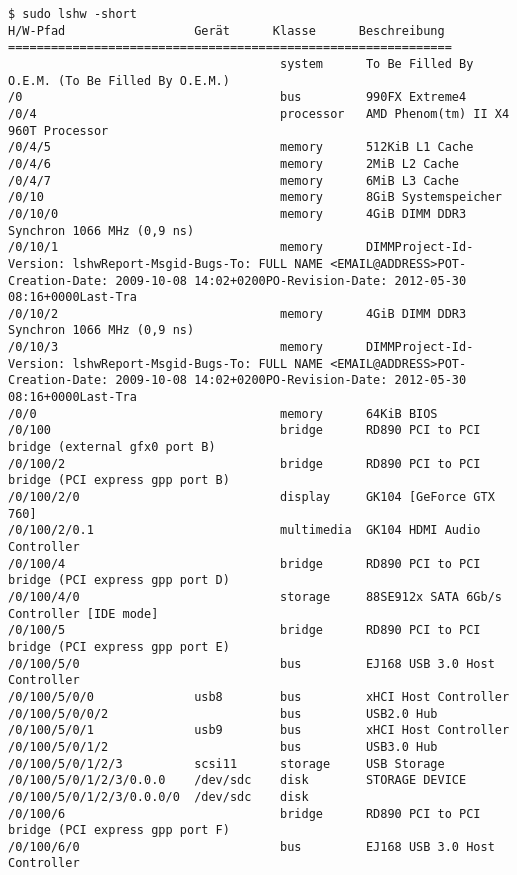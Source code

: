 \begin{small}
\begin{verbatim}
$ sudo lshw -short
H/W-Pfad                  Gerät      Klasse      Beschreibung
==============================================================
                                      system      To Be Filled By O.E.M. (To Be Filled By O.E.M.)
/0                                    bus         990FX Extreme4
/0/4                                  processor   AMD Phenom(tm) II X4 960T Processor
/0/4/5                                memory      512KiB L1 Cache
/0/4/6                                memory      2MiB L2 Cache
/0/4/7                                memory      6MiB L3 Cache
/0/10                                 memory      8GiB Systemspeicher
/0/10/0                               memory      4GiB DIMM DDR3 Synchron 1066 MHz (0,9 ns)
/0/10/1                               memory      DIMMProject-Id-Version: lshwReport-Msgid-Bugs-To: FULL NAME <EMAIL@ADDRESS>POT-Creation-Date: 2009-10-08 14:02+0200PO-Revision-Date: 2012-05-30 08:16+0000Last-Tra
/0/10/2                               memory      4GiB DIMM DDR3 Synchron 1066 MHz (0,9 ns)
/0/10/3                               memory      DIMMProject-Id-Version: lshwReport-Msgid-Bugs-To: FULL NAME <EMAIL@ADDRESS>POT-Creation-Date: 2009-10-08 14:02+0200PO-Revision-Date: 2012-05-30 08:16+0000Last-Tra
/0/0                                  memory      64KiB BIOS
/0/100                                bridge      RD890 PCI to PCI bridge (external gfx0 port B)
/0/100/2                              bridge      RD890 PCI to PCI bridge (PCI express gpp port B)
/0/100/2/0                            display     GK104 [GeForce GTX 760]
/0/100/2/0.1                          multimedia  GK104 HDMI Audio Controller
/0/100/4                              bridge      RD890 PCI to PCI bridge (PCI express gpp port D)
/0/100/4/0                            storage     88SE912x SATA 6Gb/s Controller [IDE mode]
/0/100/5                              bridge      RD890 PCI to PCI bridge (PCI express gpp port E)
/0/100/5/0                            bus         EJ168 USB 3.0 Host Controller
/0/100/5/0/0              usb8        bus         xHCI Host Controller
/0/100/5/0/0/2                        bus         USB2.0 Hub
/0/100/5/0/1              usb9        bus         xHCI Host Controller
/0/100/5/0/1/2                        bus         USB3.0 Hub
/0/100/5/0/1/2/3          scsi11      storage     USB Storage
/0/100/5/0/1/2/3/0.0.0    /dev/sdc    disk        STORAGE DEVICE
/0/100/5/0/1/2/3/0.0.0/0  /dev/sdc    disk        
/0/100/6                              bridge      RD890 PCI to PCI bridge (PCI express gpp port F)
/0/100/6/0                            bus         EJ168 USB 3.0 Host Controller

\end{verbatim}
\end{small}
